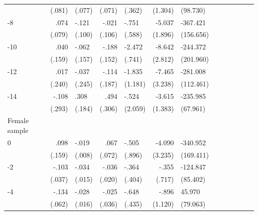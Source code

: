 \begin{table}[hp]
\begin{adjustbox}{max width=\linewidth}
\begin{threeparttable}
{\begin{tabular}{l*{6}{D{.}{.}{-1}l}}
                &   (.081)         &   (.077)         &   (.071)         &   (.362)         &  (1.304)         & (98.730)         \\
-8             &     .074         &    -.121         &    -.021         &    -.751         &   -5.037\sym{***}& -367.421\sym{**} \\
                &   (.079)         &   (.100)         &   (.106)         &   (.588)         &  (1.896)         &(156.656)         \\
-10            &     .040         &    -.062         &    -.188         &   -2.472\sym{***}&   -8.642\sym{***}& -244.372         \\
                &   (.159)         &   (.157)         &   (.152)         &   (.741)         &  (2.812)         &(201.960)         \\
-12           &     .017         &    -.037         &    -.114         &   -1.835         &   -7.465\sym{**} & -281.008\sym{**} \\
                &   (.240)         &   (.245)         &   (.187)         &  (1.181)         &  (3.238)         &(112.461)         \\
-14           &    -.108         &     .308\sym{*}  &     .494         &    -.524         &   -3.615\sym{***}& -235.985\sym{***}\\
                &   (.293)         &   (.184)         &   (.306)         &  (2.059)         &  (1.383)         & (67.961)         \\
\midrule
Female sample &&&&&&\\
0               &     .098         &    -.019\sym{**} &     .067         &    -.505         &   -4.090         & -340.952\sym{**} \\
                &   (.159)         &   (.008)         &   (.072)         &   (.896)         &  (3.235)         &(169.411)         \\
-2             &    -.103\sym{***}&    -.034\sym{**} &    -.036\sym{*}  &    -.364         &    -.355         & -124.847         \\
                &   (.037)         &   (.015)         &   (.020)         &   (.404)         &   (.717)         & (85.402)         \\
-4             &    -.134\sym{**} &    -.028\sym{*}  &    -.025         &    -.648         &    -.896         &   45.970         \\
                &   (.062)         &   (.016)         &   (.036)         &   (.435)         &  (1.120)         & (79.063)         \\

\end{tabular}}
\end{threeparttable}
\end{adjustbox}
\end{table}
